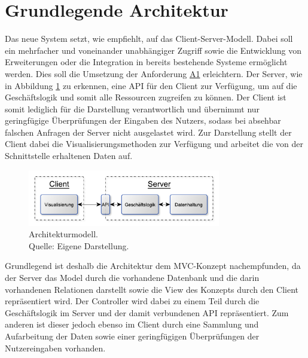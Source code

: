 \section{Grundlegende Architektur}
\label{sec:Architektur}

Das neue System setzt, wie \citeauthor{MS-Fielding.} empfiehlt, auf das Client-Server-Modell. 
Dabei soll ein mehrfacher und voneinander unabhängiger Zugriff sowie die Entwicklung von Erweiterungen oder die Integration in bereits bestehende Systeme ermöglicht werden.
Dies soll die Umsetzung der Anforderung \hyperref[Anf:A1]{A1} erleichtern.
Der Server, wie in Abbildung \ref{img:einkaufBPMN} zu erkennen, eine \ac{API} für den Client zur Verfügung, um auf die Geschäftslogik und somit alle Ressourcen zugreifen zu können.
Der Client ist somit lediglich für die Darstellung verantwortlich und übernimmt nur geringfügige Überprüfungen der Eingaben des Nutzers, sodass bei absehbar falschen Anfragen der Server nicht ausgelastet wird.
Zur Darstellung stellt der Client dabei die Visualisierungsmethoden zur Verfügung und arbeitet die von der Schnittstelle erhaltenen Daten auf.

\begin{figure}[h]
  \centering
  \includegraphics[width=0.75\textwidth]{img/konzeption/gesamtkonzept/Architektur.pdf}
  \captionsetup{format=plain,justification=centering}
  \caption[Architekturmodell]{Architekturmodell. \\Quelle: Eigene Darstellung.}
  \label{img:einkaufBPMN}
\end{figure}

Grundlegend ist deshalb die Architektur dem \ac{MVC}-Konzept nachempfunden, da der Server das Model durch die vorhandene Datenbank und die darin vorhandenen Relationen darstellt sowie die View des Konzepts durch den Client repräsentiert wird.
Der Controller wird dabei zu einem Teil durch die Geschäftslogik im Server und der damit verbundenen \ac{API} repräsentiert.
Zum anderen ist dieser jedoch ebenso im Client durch eine Sammlung und Aufarbeitung der Daten sowie einer geringfügigen Überprüfungen der Nutzereingaben vorhanden.\autocite{rf-leff2001web}